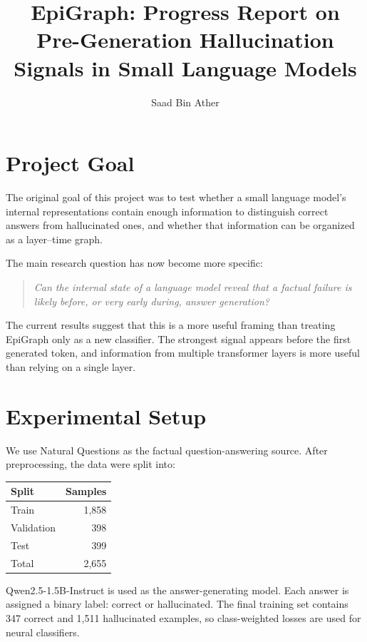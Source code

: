 \documentclass[11pt]{article}
\title{\textbf{EpiGraph: Progress Report on Pre-Generation Hallucination Signals in Small Language Models}}
\author{Saad Bin Ather}
\date{}
\begin{document}
\maketitle

\section{Project Goal}

The original goal of this project was to test whether a small language model's internal representations contain enough information to distinguish correct answers from hallucinated ones, and whether that information can be organized as a layer--time graph.

The main research question has now become more specific:

\begin{quote}
\textit{Can the internal state of a language model reveal that a factual failure is likely before, or very early during, answer generation?}
\end{quote}

The current results suggest that this is a more useful framing than treating EpiGraph only as a new classifier. The strongest signal appears before the first generated token, and information from multiple transformer layers is more useful than relying on a single layer.

\section{Experimental Setup}

We use Natural Questions as the factual question-answering source. After preprocessing, the data were split into:

\begin{center}
\begin{tabular}{lr}
\toprule
Split & Samples \\
\midrule
Train & 1,858 \\
Validation & 398 \\
Test & 399 \\
\midrule
Total & 2,655 \\
\bottomrule
\end{tabular}
\end{center}

Qwen2.5-1.5B-Instruct is used as the answer-generating model. Each answer is assigned a binary label: correct or hallucinated. The final training set contains 347 correct and 1,511 hallucinated examples, so class-weighted losses are used for neural classifiers.
\end{document}
